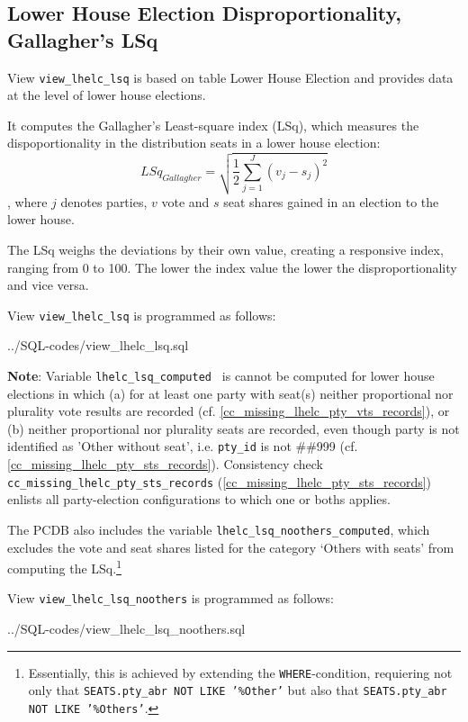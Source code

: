 \subsection{Lower House Election Disproportionality, Gallagher's LSq}\label{view_lhelc_lsq}
View \texttt{\footnotesize view\_lhelc\_lsq} is based on table Lower House Election and provides data at the level of lower house elections.

It computes the Gallagher's \citeyearpar{Gallagher1991} Least-square index (LSq), which measures the dispoportionality in the distribution seats in a lower house election: 
\begin{equation}\label{LSq_equation}
LSq_{Gallagher}=\sqrt{\frac{1}{2}\sum\limits_{j=1}^{J} (v_{j}-s_{j})^{2}}
\end{equation}, where $j$ denotes parties, $v$ vote and $s$ seat shares gained in an election to the lower house. 

The LSq weighs the deviations by their own value, creating a responsive index, ranging from 0 to 100. The lower the index value the lower the disproportionality and vice versa. 


View \texttt{\footnotesize view\_lhelc\_lsq} is programmed as follows:

%
{../SQL-codes/view_lhelc_lsq.sql}

{\bf Note}: Variable \texttt{\footnotesize lhelc\_lsq\_computed } is cannot be computed for lower house elections 
in which (a) for at least one party with seat(s) neither proportional nor plurality vote results are recorded (cf. \ref{cc_missing_lhelc_pty_vts_records}), or (b) neither proportional nor plurality seats are recorded, even though party is not identified as 'Other without seat', i.e. \texttt{\footnotesize pty\_id} is not \#\#999 (cf. \ref{cc_missing_lhelc_pty_sts_records}).
Consistency check \texttt{\footnotesize cc\_missing\_lhelc\_pty\_sts\_records} (\ref{cc_missing_lhelc_pty_sts_records}) enlists all party-election configurations to which one or boths applies.


The PCDB also includes the variable \texttt{\footnotesize lhelc\_lsq\_noothers\_computed}, which excludes the vote and seat shares listed for the category `Others with seats' from computing the LSq.\footnote{Essentially, this is achieved by extending the \texttt{\smallfont WHERE}-condition, requiering not only that \texttt{\smallfont SEATS.pty\_abr NOT LIKE '\%Other'} but also that \texttt{\smallfont SEATS.pty\_abr NOT LIKE '\%Others'}.}

View \texttt{\footnotesize view\_lhelc\_lsq\_noothers} is programmed as follows:

%
{../SQL-codes/view_lhelc_lsq_noothers.sql}